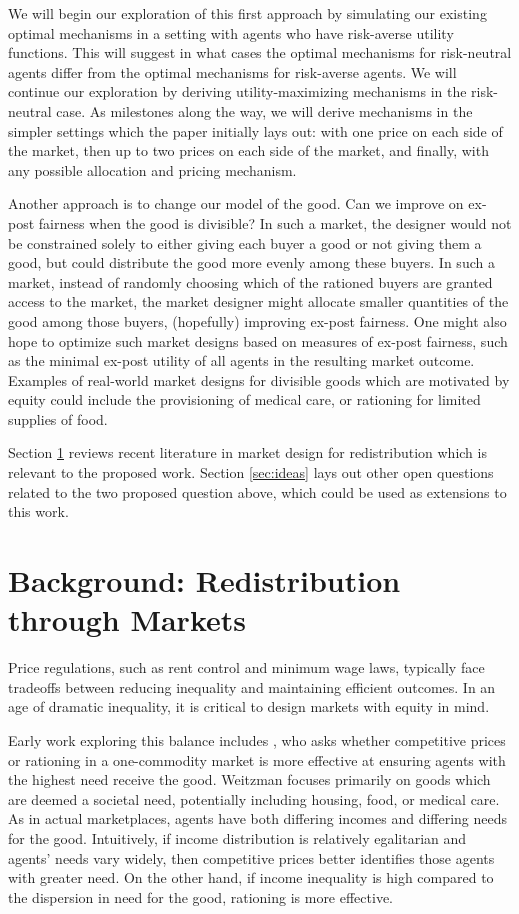 \documentclass[JEL]{AEA}
\begin{document}
We will begin our exploration of this first approach by simulating our existing optimal mechanisms in a setting with agents who have risk-averse utility functions. This will suggest in what cases the optimal mechanisms for risk-neutral agents differ from the optimal mechanisms for risk-averse agents. We will continue our exploration by deriving utility-maximizing mechanisms in the risk-neutral case. As milestones along the way, we will derive mechanisms in the simpler settings which the paper initially lays out: with one price on each side of the market, then up to two prices on each side of the market, and finally, with any possible allocation and pricing mechanism.

Another approach is to change our model of the good. Can we improve on ex-post fairness when the good is divisible? In such a market, the designer would not be constrained solely to either giving each buyer a good or not giving them a good, but could distribute the good more evenly among these buyers. In such a market, instead of randomly choosing which of the rationed buyers are granted access to the market, the market designer might allocate smaller quantities of the good among those buyers, (hopefully) improving ex-post fairness. One might also hope to optimize such market designs based on measures of ex-post fairness, such as the minimal ex-post utility of all agents in the resulting market outcome. Examples of real-world market designs for divisible goods which are motivated by equity could include the provisioning of medical care, or rationing for limited supplies of food.

Section \ref{sec:background-redist} reviews recent literature in market design for redistribution which is relevant to the proposed work. Section \ref{sec:ideas} lays out other open questions related to the two proposed question above, which could be used as extensions to this work.

\section{Background: Redistribution through Markets}
\label{sec:background-redist}

Price regulations, such as rent control and minimum wage laws, typically face tradeoffs between reducing inequality and maintaining efficient outcomes. In an age of dramatic inequality, it is critical to design markets with equity in mind.

Early work exploring this balance includes \cite{weitzman-1977}, who asks whether competitive prices or rationing in a one-commodity market is more effective at ensuring agents with the highest need receive the good. Weitzman focuses primarily on goods which are deemed a societal need, potentially including housing, food, or medical care. As in actual marketplaces, agents have both differing incomes and differing needs for the good. Intuitively, if income distribution is relatively egalitarian and agents' needs vary widely, then competitive prices better identifies those agents with greater need. On the other hand, if income inequality is high compared to the dispersion in need for the good, rationing is more effective.
\end{document}

